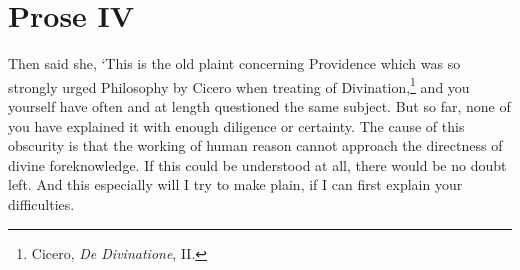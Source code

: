 \section*{Prose IV}

Then said she, `This is the old plaint concerning Providence which was
so strongly urged Philosophy by Cicero when treating of
Divination,\footnote{Cicero, \textit{De Divinatione}, \textsc{II}.}
and you yourself have often and at length questioned the same subject.
But so far, none of you have explained it with enough diligence or
certainty. The cause of this obscurity is that the working of human
reason cannot approach the directness of divine foreknowledge. If this
could be understood at all, there would be no doubt left. And this
especially will I try to make plain, if I can first explain your
difficulties.

